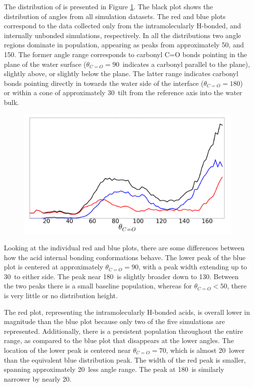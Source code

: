 The distribution of \thetacarb is presented in Figure \ref{fig:theta-carb}. The black plot shows the distribution of angles from all simulation datasets. The red and blue plots correspond to the \thetacarb data collected only from the intramolecularly H-bonded, and internally unbonded simulations, respectively. In all the distributions two angle regions dominate in population, appearing as peaks from approximately 50\degr, and 150\degr. The former angle range corresponds to carbonyl C=O bonds pointing in the plane of the water surface ($\theta_{C=O}=90$\degr~indicates a carbonyl parallel to the plane), slightly above, or slightly below the plane. The latter range indicates carbonyl bonds pointing directly in towards the water side of the interface ($\theta_{C=O}=180$\degr) or within a cone of approximately 30\degr~tilt from the reference axis into the water bulk.


\begin{figure}[h!]
	\begin{center}
		\includegraphics[scale=1.0]{images/orientation/Carbonyl-CO-Theta.png}
		\caption{}
		\label{fig:theta-carb}
	\end{center}
\end{figure}

Looking at the individual red and blue plots, there are some differences between how the acid internal bonding conformations behave. The lower peak of the blue plot is centered at approximately $\theta_{C=O}=90$\degr, with a peak width extending up to 30\degr~to either side. The peak near 180\degr~is slightly broader down to 130\degr. Between the two peaks there is a small baseline population, whereas for $\theta_{C=O} < 50$\degr, there is very little or no distribution height.

The red plot, representing the intramolecularly H-bonded acids, is overall lower in magnitude than the blue plot because only two of the five simulations are represented. Additionally, there is a persistent population throughout the entire \thetacarb range, as compared to the blue plot that disappears at the lower angles. The location of the lower peak is centered near $\theta_{C=O}=70$\degr, which is almost 20\degr~lower than the equivalent blue distribution peak. The width of the red peak is smaller, spanning approximately 20\degr~less angle range. The peak at 180\degr~is similarly narrower by nearly 20\degr.

